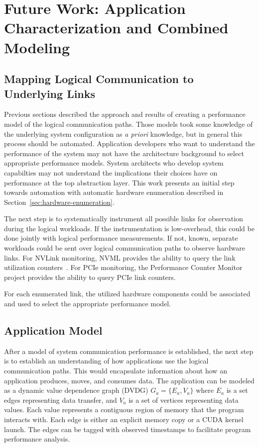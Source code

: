 \chapter{Future Work: Application Characterization and Combined Modeling}
\label{ch:future}

\section{Mapping Logical Communication to Underlying Links}

Previous sections described the approach and results of creating a performance model of the logical communication paths.
Those models took some knowledge of the underlying system configuration as \textit{a priori} knowledge, but in general this process should be automated.
Application developers who want to understand the performance of the system may not have the architecture background to select appropriate performance models.
System architects who develop system capabilties may not understand the implications their choices have on performance at the top abstraction layer.
This work presents an initial step towards automation with automatic hardware enumeration described in Section~\ref{sec:hardware-enumeration}.

The next step is to systematically instrument all possible links for observation during the logical workloads.
If the instrumentation is low-overhead, this could be done jointly with logical performance measurements.
If not, known, separate workloads could be sent over logical communication paths to observe hardware links.
For NVLink monitoring, NVML provides the ability to query the link utilization counters~\cite{nvidia2017nvmlreference}.
For PCIe monitoring, the Performance Counter Monitor~\cite{opcm2018pcm} project provides the ability to query PCIe link counters.

For each enumerated link, the utilized hardware components could be associated and used to select the appropriate performance model.

\section{Application Model}

After a model of system communication performance is established, the next step is to establish an understanding of how applications use the logical communication paths.
This would encapsulate information about how an application produces, moves, and consumes data.
The application can be modeled as a dynamic value dependence graph (DVDG) $G_a = \{E_a,V_a\}$ where $E_a$ is a set edges representing data transfer, and $V_a$ is a set of vertices representing data values.
Each value represents a contiguous region of memory that the program interacts with.
Each edge is either an explicit memory copy or a CUDA kernel launch.
The edges can be tagged with observed timestamps to facilitate program performance analysis.

